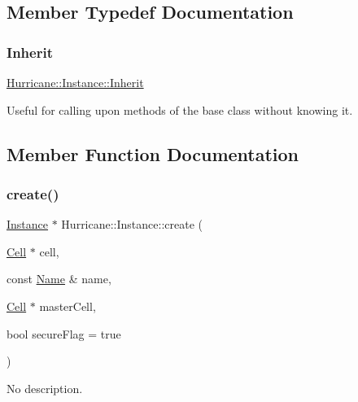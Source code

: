 \subsection{Member Typedef Documentation}
\mbox{\label{classHurricane_1_1Instance_a227e1f98670e466328ca95fe45546590}} 
\subsubsection{\texorpdfstring{Inherit}{Inherit}}
{\footnotesize\ttfamily \hyperlink{classHurricane_1_1Instance_a227e1f98670e466328ca95fe45546590}{Hurricane\+::\+Instance\+::\+Inherit}}

Useful for calling upon methods of the base class without knowing it. 

\subsection{Member Function Documentation}
\mbox{\label{classHurricane_1_1Instance_ae130b66536e4536ba8852fb79abfb89e}} 
\subsubsection{\texorpdfstring{create()}{create()}\hspace{0.1cm}{\footnotesize\ttfamily [1/2]}}
{\footnotesize\ttfamily \hyperlink{classHurricane_1_1Instance}{Instance} $\ast$ Hurricane\+::\+Instance\+::create (\begin{DoxyParamCaption}\item[{\hyperlink{classHurricane_1_1Cell}{Cell} $\ast$}]{cell,  }\item[{const \hyperlink{classHurricane_1_1Name}{Name} \&}]{name,  }\item[{\hyperlink{classHurricane_1_1Cell}{Cell} $\ast$}]{master\+Cell,  }\item[{bool}]{secure\+Flag = {\ttfamily true} }\end{DoxyParamCaption})\hspace{0.3cm}{\ttfamily [static]}}

No description. 

